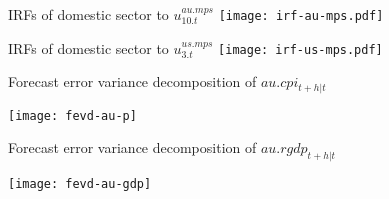 \documentclass[notes,blackandwhite,mathsans,usenames,dvipsnames]{beamer}
\begin{document}
\begin{frame}{IRFs of domestic sector to $u_{10.t}^{au.mps}$}
\centering
\texttt{[image: irf-au-mps.pdf]}

\end{frame}

\begin{frame}{IRFs of domestic sector to $u_{3.t}^{us.mps}$}
\centering
\texttt{[image: irf-us-mps.pdf]}

\end{frame}


\begin{frame}{Forecast error variance decomposition of $au.cpi_{t+h|t}$}

\centering
\texttt{[image: fevd-au-p]}

\end{frame}


\begin{frame}{Forecast error variance decomposition of $au.rgdp_{t+h|t}$}

\centering
\texttt{[image: fevd-au-gdp]}

\end{frame}
\end{document}
